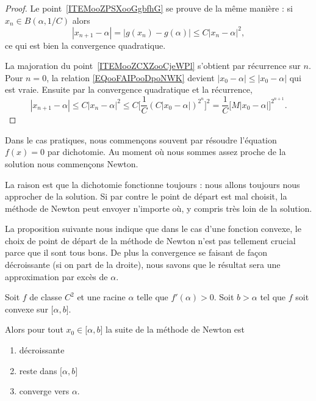 \begin{proof}
    Le point~\ref{ITEMooZPSXooGgbfhG} se prouve de la même manière : si \( x_n\in B(\alpha,1/C)\) alors
    \begin{equation}
        | x_{n+1}-\alpha |=| g(x_n)-g(\alpha) |\leq C| x_n-\alpha |^2,
    \end{equation}
    ce qui est bien la convergence quadratique.

    La majoration du point~\ref{ITEMooZCXZooCjeWPl} s'obtient par récurrence sur \( n\). Pour \( n=0\), la relation \eqref{EQooFAIPooDpoNWK} devient \( | x_0-\alpha |\leq | x_0-\alpha |\) qui est vraie. Ensuite par la convergence quadratique et la récurrence,
    \begin{equation}
        | x_{n+1}-\alpha |\leq C| x_n-\alpha |^2\leq C\big[  \frac{1}{ C }(C| x_0-\alpha |)^{2^n}  \big]^2=\frac{1}{ C }\big[ M| x_0-\alpha | \big]^{2^{n+1}}.
    \end{equation}
\end{proof}

\begin{normaltext}
    Dans le cas pratiques, nous commençons souvent par résoudre l'équation \( f(x)=0\) par dichotomie. Au moment où nous sommes assez proche de la solution nous commençons Newton.

    La raison est que la dichotomie fonctionne toujours : nous allons toujours nous approcher de la solution. Si par contre le point de départ est mal choisit, la méthode de Newton peut envoyer n'importe où, y compris très loin de la solution.
\end{normaltext}

La proposition suivante nous indique que dans le cas d'une fonction convexe, le choix de point de départ de la méthode de Newton n'est pas tellement crucial parce que il sont tous bons. De plus la convergence se faisant de façon décroissante (si on part de la droite), nous savons que le résultat sera une approximation par excès de \( \alpha\).
\begin{proposition}     \label{PROPooVTSAooAtSLeI}
    Soit \( f\) de classe \( C^2\) et une racine \( \alpha\) telle que \( f'(\alpha)>0\). Soit \( b>\alpha \) tel que \( f\) soit convexe sur \( \mathopen[ \alpha , b \mathclose]\).

    Alors pour tout \( x_0\in\mathopen[ \alpha , b \mathclose]\) la suite de la méthode de Newton est
    \begin{enumerate}
        \item
            décroissante
        \item
            reste dans \( \mathopen[ \alpha , b \mathclose]\)
        \item
            converge vers \( \alpha\).
    \end{enumerate}
\end{proposition}

